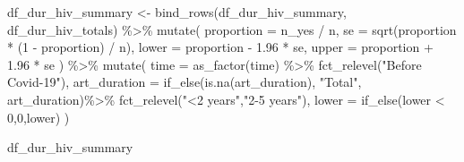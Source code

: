 \documentclass[
  letterpaper,
  DIV=11,
  numbers=noendperiod]{scrartcl}
\newenvironment{Shaded}{\begin{snugshade}}{\end{snugshade}}
\newcommand{\AttributeTok}[1]{\textcolor[rgb]{0.40,0.45,0.13}{#1}}
\newcommand{\DecValTok}[1]{\textcolor[rgb]{0.68,0.00,0.00}{#1}}
\newcommand{\FloatTok}[1]{\textcolor[rgb]{0.68,0.00,0.00}{#1}}
\newcommand{\FunctionTok}[1]{\textcolor[rgb]{0.28,0.35,0.67}{#1}}
\newcommand{\NormalTok}[1]{\textcolor[rgb]{0.00,0.23,0.31}{#1}}
\newcommand{\OtherTok}[1]{\textcolor[rgb]{0.00,0.23,0.31}{#1}}
\newcommand{\SpecialCharTok}[1]{\textcolor[rgb]{0.37,0.37,0.37}{#1}}
\newcommand{\StringTok}[1]{\textcolor[rgb]{0.13,0.47,0.30}{#1}}
\begin{document}
\begin{Shaded}
\begin{Highlighting}[]
\NormalTok{df\_dur\_hiv\_summary }\OtherTok{\textless{}{-}} \FunctionTok{bind\_rows}\NormalTok{(df\_dur\_hiv\_summary, df\_dur\_hiv\_totals) }\SpecialCharTok{\%\textgreater{}\%}
  \FunctionTok{mutate}\NormalTok{(}
    \AttributeTok{proportion =}\NormalTok{ n\_yes }\SpecialCharTok{/}\NormalTok{ n,}
    \AttributeTok{se =} \FunctionTok{sqrt}\NormalTok{(proportion }\SpecialCharTok{*}\NormalTok{ (}\DecValTok{1} \SpecialCharTok{{-}}\NormalTok{ proportion) }\SpecialCharTok{/}\NormalTok{ n),}
    \AttributeTok{lower =}\NormalTok{ proportion }\SpecialCharTok{{-}} \FloatTok{1.96} \SpecialCharTok{*}\NormalTok{ se,}
    \AttributeTok{upper =}\NormalTok{ proportion }\SpecialCharTok{+} \FloatTok{1.96} \SpecialCharTok{*}\NormalTok{ se}
\NormalTok{  ) }\SpecialCharTok{\%\textgreater{}\%} 
  \FunctionTok{mutate}\NormalTok{(}
    \AttributeTok{time =} \FunctionTok{as\_factor}\NormalTok{(time) }\SpecialCharTok{\%\textgreater{}\%} 
      \FunctionTok{fct\_relevel}\NormalTok{(}\StringTok{"Before Covid{-}19"}\NormalTok{),}
    \AttributeTok{art\_duration =} \FunctionTok{if\_else}\NormalTok{(}\FunctionTok{is.na}\NormalTok{(art\_duration), }\StringTok{"Total"}\NormalTok{, art\_duration)}\SpecialCharTok{\%\textgreater{}\%} 
      \FunctionTok{fct\_relevel}\NormalTok{(}\StringTok{"\textless{}2 years"}\NormalTok{,}\StringTok{"2{-}5 years"}\NormalTok{),}
    \AttributeTok{lower =} \FunctionTok{if\_else}\NormalTok{(lower }\SpecialCharTok{\textless{}} \DecValTok{0}\NormalTok{,}\DecValTok{0}\NormalTok{,lower)}
\NormalTok{  )}

\NormalTok{df\_dur\_hiv\_summary}
\end{Highlighting}
\end{Shaded}
\end{document}
